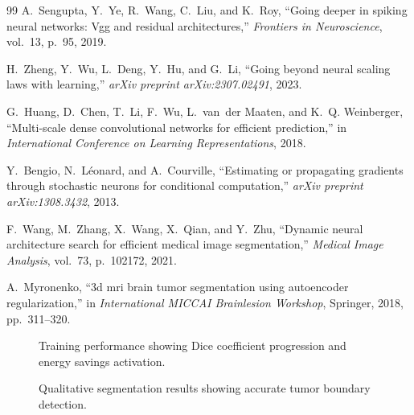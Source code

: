\documentclass[12pt,a4paper]{article}
\begin{document}
\begin{thebibliography}{99}
A.~Sengupta, Y.~Ye, R.~Wang, C.~Liu, and K.~Roy, ``Going deeper in spiking neural networks: Vgg and residual architectures,'' \textit{Frontiers in Neuroscience}, vol.~13, p.~95, 2019.

H.~Zheng, Y.~Wu, L.~Deng, Y.~Hu, and G.~Li, ``Going beyond neural scaling laws with learning,'' \textit{arXiv preprint arXiv:2307.02491}, 2023.

G.~Huang, D.~Chen, T.~Li, F.~Wu, L.~van~der Maaten, and K.~Q. Weinberger, ``Multi-scale dense convolutional networks for efficient prediction,'' in \textit{International Conference on Learning Representations}, 2018.

Y.~Bengio, N.~Léonard, and A.~Courville, ``Estimating or propagating gradients through stochastic neurons for conditional computation,'' \textit{arXiv preprint arXiv:1308.3432}, 2013.

F.~Wang, M.~Zhang, X.~Wang, X.~Qian, and Y.~Zhu, ``Dynamic neural architecture search for efficient medical image segmentation,'' \textit{Medical Image Analysis}, vol.~73, p.~102172, 2021.

A.~Myronenko, ``3d mri brain tumor segmentation using autoencoder regularization,'' in \textit{International MICCAI Brainlesion Workshop}, Springer, 2018, pp.~311--320.

\end{thebibliography}

\begin{figure}[H]
\centering
\caption{Training performance showing Dice coefficient progression and energy savings activation.}
\label{fig:training}
\end{figure}

\begin{figure}[H]
\centering
\caption{Qualitative segmentation results showing accurate tumor boundary detection.}
\label{fig:qualitative}
\end{figure}
\end{document}
